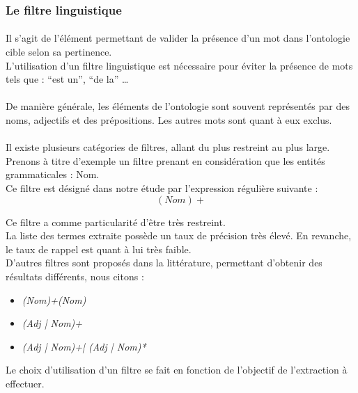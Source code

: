 \documentclass[12pt, a4paper, oneside]{book}
\begin{document}
\subsubsection{Le filtre linguistique}

\paragraph{}
Il s'agit de l'élément permettant de valider la présence d'un mot dans l'ontologie cible selon sa pertinence.\\ 
L'utilisation d'un filtre linguistique est nécessaire pour éviter la présence de mots tels que  : “est un”, “de la” … 
\paragraph{}
De manière générale, les éléments de l'ontologie sont souvent représentés par des noms, adjectifs et des prépositions. Les autres mots sont quant à eux exclus.
\paragraph{}
Il existe plusieurs catégories de filtres, allant du plus restreint au plus large.\\
Prenons à titre d'exemple un filtre prenant en considération que les entités grammaticales : Nom.\\
Ce filtre est désigné dans notre étude par l'expression régulière suivante : 
$$(Nom)+ $$

Ce filtre a comme particularité d'être très restreint.\\

La liste des termes extraite possède un taux de précision très élevé. En revanche, le taux de rappel est quant à lui très faible. \\

D'autres filtres sont proposés dans la littérature, permettant d'obtenir des résultats différents, nous citons : \\
\begin{itemize}
\item \textit{(Nom)+(Nom)} \\
\item \textit{(Adj | Nom)+} \\
\item \textit{(Adj | Nom)+| (Adj | Nom)*} \\
\end{itemize}

Le choix d'utilisation d'un filtre se fait en fonction de l'objectif de l'extraction à effectuer.
\end{document}
